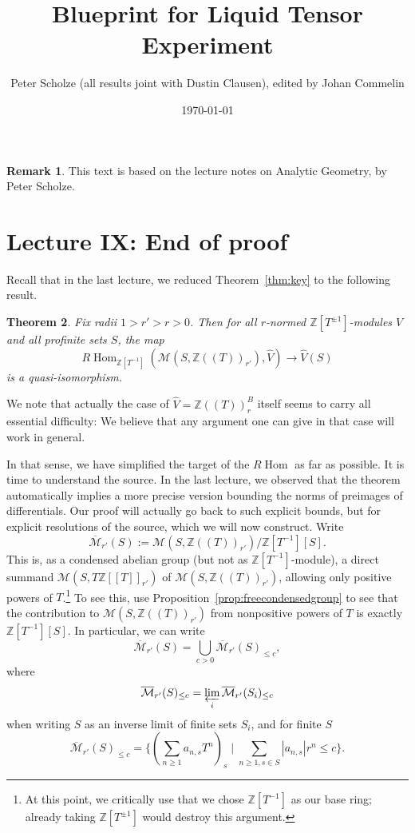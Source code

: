 \documentclass[11pt]{amsart}
\date{\today}
\title{Blueprint for Liquid Tensor Experiment}
\author{Peter Scholze (all results joint with Dustin Clausen),
edited by Johan Commelin}
\DeclareMathOperator{\Hom}{Hom}
\numberwithin{equation}{section}
\newtheorem{theorem}{Theorem}
\numberwithin{theorem}{section}
\theoremstyle{definition}
\newtheorem{remark}[theorem]{Remark}
\begin{document}
\maketitle

\begin{remark}
This text is based on the lecture notes on Analytic Geometry,
by Peter Scholze.
\end{remark}

\section{Lecture IX: End of proof}

Recall that in the last lecture, we reduced Theorem~\ref{thm:key} to the following result.

\begin{theorem}\label{thm:explicit1} Fix radii $1>r'>r>0$. Then for all $r$-normed $\mathbb Z[T^{\pm 1}]$-modules $V$ and all profinite sets $S$, the map
\[
R\Hom_{\mathbb Z[T^{-1}]}(\mathcal M(S,\mathbb Z((T))_{r'}),\widehat{V})\to \widehat{V}(S)
\]
is a quasi-isomorphism.
\end{theorem}

We note that actually the case of $\widehat{V}=\mathbb Z((T))_r^B$ itself seems to carry all essential difficulty: We believe that any argument one can give in that case will work in general.

In that sense, we have simplified the target of the $R\Hom$ as far as possible. It is time to understand the source. In the last lecture, we observed that the theorem automatically implies a more precise version bounding the norms of preimages of differentials. Our proof will actually go back to such explicit bounds, but for explicit resolutions of the source, which we will now construct. Write
\[
\overline{\mathcal M}_{r'}(S) := \mathcal M(S,\mathbb Z((T))_{r'})/\mathbb Z[T^{-1}][S].
\]
This is, as a condensed abelian group (but not as $\mathbb Z[T^{-1}]$-module), a direct summand $\mathcal M(S,T\mathbb Z[[T]]_{r'})$ of $\mathcal M(S,\mathbb Z((T))_{r'})$, allowing only positive powers of $T$.\footnote{At this point, we critically use that we chose $\mathbb Z[T^{-1}]$ as our base ring; already taking $\mathbb Z[T^{\pm 1}]$ would destroy this argument.} To see this, use Proposition~\ref{prop:freecondensedgroup} to see that the contribution to $\mathcal M(S,\mathbb Z((T))_{r'})$ from nonpositive powers of $T$ is exactly $\mathbb Z[T^{-1}][S]$. In particular, we can write
\[
\overline{\mathcal M}_{r'}(S) = \bigcup_{c>0} \overline{\mathcal M}_{r'}(S)_{\leq c},
\]
where
\[
\overline{\mathcal M}_{r'}(S)_{\leq c} = \varprojlim_i \overline{\mathcal M}_{r'}(S_i)_{\leq c}
\]
when writing $S$ as an inverse limit of finite sets $S_i$, and for finite $S$
\[
\overline{\mathcal M}_{r'}(S)_{\leq c} = \{(\sum_{n\geq 1} a_{n,s} T^n)_s\mid \sum_{n\geq 1,s\in S} |a_{n,s}|r^n\leq c\}.
\]
\end{document}
